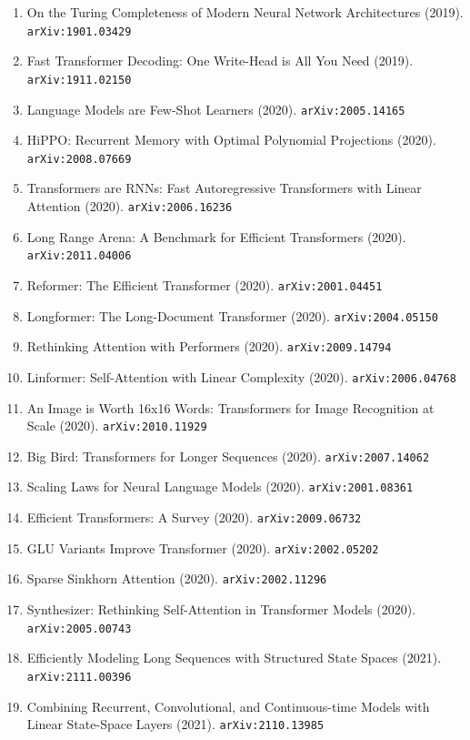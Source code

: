 \documentclass[11pt]{article}
\begin{document}
\begin{enumerate}
  Attention via the Lens of Kernel (2019). \texttt{arXiv:1908.11775}
  \item On the Turing Completeness of Modern Neural Network Architectures (2019). \texttt{arXiv:1901.03429}
  \item Fast Transformer Decoding: One Write-Head is All You Need (2019). \texttt{arXiv:1911.02150}
  \item Language Models are Few-Shot Learners (2020). \texttt{arXiv:2005.14165}
  \item HiPPO: Recurrent Memory with Optimal Polynomial Projections (2020). \texttt{arXiv:2008.07669}
  \item Transformers are RNNs: Fast Autoregressive Transformers with Linear
  Attention (2020). \texttt{arXiv:2006.16236}
  \item Long Range Arena: A Benchmark for Efficient Transformers (2020). \texttt{arXiv:2011.04006}
  \item Reformer: The Efficient Transformer (2020). \texttt{arXiv:2001.04451}
  \item Longformer: The Long-Document Transformer (2020). \texttt{arXiv:2004.05150}
  \item Rethinking Attention with Performers (2020). \texttt{arXiv:2009.14794}
  \item Linformer: Self-Attention with Linear Complexity (2020). \texttt{arXiv:2006.04768}
  \item An Image is Worth 16x16 Words: Transformers for Image Recognition at
  Scale (2020). \texttt{arXiv:2010.11929}
  \item Big Bird: Transformers for Longer Sequences (2020). \texttt{arXiv:2007.14062}
  \item Scaling Laws for Neural Language Models (2020). \texttt{arXiv:2001.08361}
  \item Efficient Transformers: A Survey (2020). \texttt{arXiv:2009.06732}
  \item GLU Variants Improve Transformer (2020). \texttt{arXiv:2002.05202}
  \item Sparse Sinkhorn Attention (2020). \texttt{arXiv:2002.11296}
  \item Synthesizer: Rethinking Self-Attention in Transformer Models (2020). \texttt{arXiv:2005.00743}
  \item Efficiently Modeling Long Sequences with Structured State Spaces (2021). \texttt{arXiv:2111.00396}
  \item Combining Recurrent, Convolutional, and Continuous-time Models with
  Linear State-Space Layers (2021). \texttt{arXiv:2110.13985}

\end{enumerate}
\end{document}
